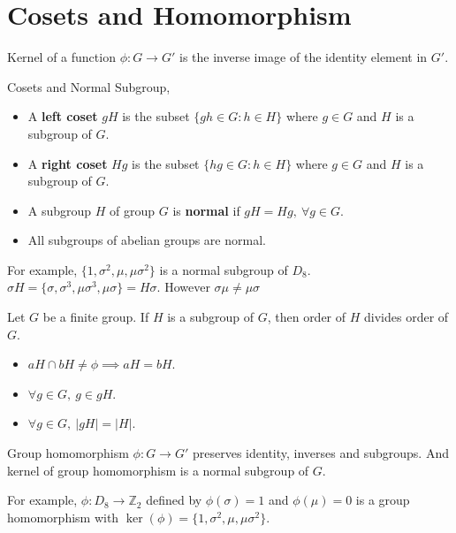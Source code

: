 \section{Cosets and Homomorphism}
\begin{definition}
	Kernel of a function $\phi : G \to G'$ is the inverse image of the identity element in $G'$. %
\end{definition}

\begin{definition}Cosets and Normal Subgroup,
	\begin{itemize}
		\item A \textbf{left coset} $gH$ is the subset $\{ gh \in G : h \in H \}$ where $g \in G$ and  $H$ is a subgroup of $G$.%
		\item A \textbf{right coset} $Hg$ is the subset $\{ hg \in G : h \in H \}$ where $g \in G$ and  $H$ is a subgroup of $G$.%
		\item A subgroup $H$ of group $G$ is \textbf{normal} if $gH = Hg,\ \forall g \in G$.
		\item All subgroups of abelian groups are normal.
	\end{itemize}
\end{definition}

\begin{remark}
	For example, $\{1,\sigma^2,\mu,\mu\sigma^2\}$ is a normal subgroup of $D_8$.\\
	$\sigma H = \{ \sigma, \sigma^3, \mu\sigma^3, \mu\sigma \} = H\sigma$. However $\sigma\mu \ne \mu\sigma$
\end{remark}
\begin{remark}%
	Let $G$ be a finite group. If $H$ is a subgroup of $G$, then order of $H$ divides order of $G$.
\end{remark}
\begin{itemize}
	\item $aH \cap bH \ne \phi \implies aH = bH$.
	\item $\forall g \in G,\ g \in gH$.
	\item $\forall g \in G,\ |gH| = |H|$.
\end{itemize}

\begin{remark}
	Group homomorphism $\phi : G \to G'$ preserves identity, inverses and subgroups. And kernel of group homomorphism is a normal subgroup of $G$.%
\end{remark}
\begin{remark}
	For example, $\phi : D_8 \to \mathbb{Z}_2$ defined by $\phi(\sigma) = 1$ and $\phi(\mu) = 0$ is a group homomorphism with $\ker(\phi) = \{ 1,\sigma^2,\mu,\mu\sigma^2 \}$.
\end{remark}
\pagebreak

